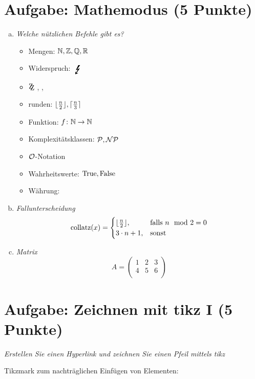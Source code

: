 \section{Aufgabe: Mathemodus \hfill (5 Punkte)}
\begin{enumerate}[a)]
\item {\itshape Welche nützlichen Befehle gibt es?}		%
	\begin{itemize}\setlength{\itemsep}{-1ex}				%
	\item Mengen: $\mathbb{N}, \mathbb{Z}, \mathbb{Q}, \mathbb{R}$
	\item Widerspruch: $\Bolt$
	\item $\zz$, \gdw, \oBdA
	\item runden: $\lfloor{\frac{n}{2}}\rfloor, \lceil{\frac{n}{3}}\rceil$
	\item Funktion: $f \colon \mathbb{N} \to \mathbb{N}$
	\item Komplexitätsklassen: $\mathcal{P}, \mathcal{NP}$
	\item $\operatorname{\mathcal{O}}$-Notation
	\item Wahrheitswerte: $\operatorname{True}, \operatorname{False}$
	\item Währung: \Eu
	\end{itemize}

\item {\itshape Fallunterscheidung}						%
	\[ \text{collatz}(x) = \begin{cases}
			         \lfloor{\frac{n}{2}}\rfloor, & \text{falls } n \mod 2 = 0 \\
			         3\cdot n+1, & \text{sonst} \\
	                \end{cases}
	\]
	
\item {\itshape Matrix}										%
	\[ A = \begin{pmatrix}
		1 & 2 & 3 \\
		4 & 5 & 6 \\
	\end{pmatrix}
	\]
\end{enumerate}

\section{Aufgabe: Zeichnen mit tikz I \hfill (5 Punkte)}
{\itshape Erstellen Sie einen Hyperlink und zeichnen Sie einen Pfeil mittels tikz}

Tikzmark zum nachträglichen Einfügen von Elementen:

